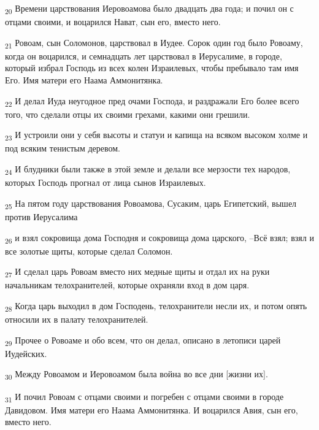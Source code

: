 \begin{tcolorbox}
\textsubscript{20} Времени царствования Иеровоамова было двадцать два года; и почил он с отцами своими, и воцарился Нават, сын его, вместо него.
\end{tcolorbox}
\begin{tcolorbox}
\textsubscript{21} Ровоам, сын Соломонов, царствовал в Иудее. Сорок один год было Ровоаму, когда он воцарился, и семнадцать лет царствовал в Иерусалиме, в городе, который избрал Господь из всех колен Израилевых, чтобы пребывало там имя Его. Имя матери его Наама Аммонитянка.
\end{tcolorbox}
\begin{tcolorbox}
\textsubscript{22} И делал Иуда неугодное пред очами Господа, и раздражали Его более всего того, что сделали отцы их своими грехами, какими они грешили.
\end{tcolorbox}
\begin{tcolorbox}
\textsubscript{23} И устроили они у себя высоты и статуи и капища на всяком высоком холме и под всяким тенистым деревом.
\end{tcolorbox}
\begin{tcolorbox}
\textsubscript{24} И блудники были также в этой земле и делали все мерзости тех народов, которых Господь прогнал от лица сынов Израилевых.
\end{tcolorbox}
\begin{tcolorbox}
\textsubscript{25} На пятом году царствования Ровоамова, Сусаким, царь Египетский, вышел против Иерусалима
\end{tcolorbox}
\begin{tcolorbox}
\textsubscript{26} и взял сокровища дома Господня и сокровища дома царского, --Всё взял; взял и все золотые щиты, которые сделал Соломон.
\end{tcolorbox}
\begin{tcolorbox}
\textsubscript{27} И сделал царь Ровоам вместо них медные щиты и отдал их на руки начальникам телохранителей, которые охраняли вход в дом царя.
\end{tcolorbox}
\begin{tcolorbox}
\textsubscript{28} Когда царь выходил в дом Господень, телохранители несли их, и потом опять относили их в палату телохранителей.
\end{tcolorbox}
\begin{tcolorbox}
\textsubscript{29} Прочее о Ровоаме и обо всем, что он делал, описано в летописи царей Иудейских.
\end{tcolorbox}
\begin{tcolorbox}
\textsubscript{30} Между Ровоамом и Иеровоамом была война во все дни [жизни их].
\end{tcolorbox}
\begin{tcolorbox}
\textsubscript{31} И почил Ровоам с отцами своими и погребен с отцами своими в городе Давидовом. Имя матери его Наама Аммонитянка. И воцарился Авия, сын его, вместо него.
\end{tcolorbox}
